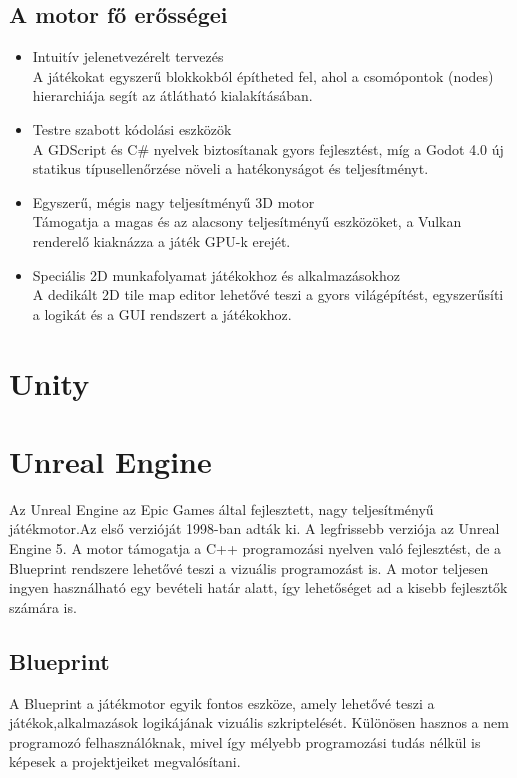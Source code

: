 \documentclass[
]{thesis-ekf}
\theoremstyle{definition}
\theoremstyle{remark}
\begin{document}
\subsection{A motor fő erősségei}
\begin{itemize}
	\item Intuitív jelenetvezérelt tervezés \\ A játékokat egyszerű blokkokból építheted fel, ahol a csomópontok (nodes) hierarchiája segít az átlátható kialakításában.
	\item Testre szabott kódolási eszközök \\ A GDScript és C\# nyelvek biztosítanak gyors fejlesztést, míg a Godot 4.0 új statikus típusellenőrzése növeli a hatékonyságot és teljesítményt.
	\item Egyszerű, mégis nagy teljesítményű 3D motor \\ Támogatja a magas és az alacsony teljesítményű eszközöket, a Vulkan renderelő kiaknázza a játék GPU-k erejét.
	\item Speciális 2D munkafolyamat játékokhoz és alkalmazásokhoz \\ A dedikált 2D tile map editor lehetővé teszi a gyors világépítést, egyszerűsíti a logikát és a GUI rendszert a játékokhoz.
\end{itemize}

\section{Unity}
\section{Unreal Engine}

Az Unreal Engine az Epic Games által fejlesztett, nagy teljesítményű játékmotor.Az első verzióját 1998-ban adták ki. A legfrissebb verziója az Unreal Engine 5. A motor támogatja a C++ programozási nyelven való fejlesztést, de a Blueprint rendszere lehetővé teszi a vizuális programozást is. A motor teljesen ingyen használható egy bevételi határ alatt, így lehetőséget ad a kisebb fejlesztők számára is.

\subsection{Blueprint}
A Blueprint a játékmotor egyik fontos eszköze, amely lehetővé teszi a játékok,alkalmazások logikájának vizuális szkriptelését. Különösen hasznos a nem programozó felhasználóknak, mivel így mélyebb programozási tudás nélkül is képesek a projektjeiket megvalósítani.
\end{document}
